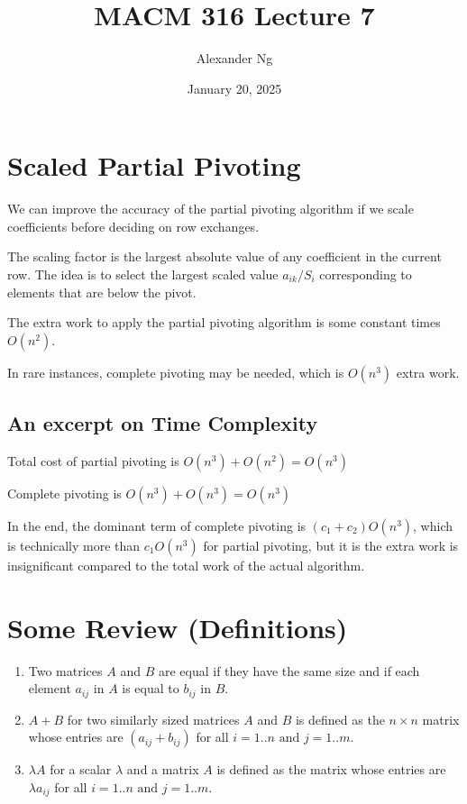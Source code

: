 \documentclass[12pt]{article}
\begin{document}
\renewcommand{\arraystretch}{1.25} %
\setlength{\arraycolsep}{12pt}

\title{MACM 316 Lecture 7}
\author{Alexander Ng}
\date{January 20, 2025}

\maketitle

\section{Scaled Partial Pivoting}

We can improve the accuracy of the partial pivoting algorithm if we scale 
coefficients before deciding on row exchanges.

The scaling factor is the largest absolute value of any coefficient in the 
current row. The idea is to select the largest scaled value $a_{ik}/S_i$
corresponding to elements that are below the pivot.

The extra work to apply the partial pivoting algorithm is some constant
times $O(n^2)$.

In rare instances, complete pivoting may be needed, which is $O(n^3)$ extra
work.

\subsection{An excerpt on Time Complexity}

Total cost of partial pivoting is $O(n^3) + O(n^2) = O(n^3)$

Complete pivoting is $O(n^3) + O(n^3) = O(n^3)$

In the end, the dominant term of complete pivoting is $(c_1 + c_2) O(n^3)$, 
which is technically more than $c_1 O(n^3)$ for partial pivoting, but it is
the extra work is insignificant compared to the total work of the actual 
algorithm.

\section{Some Review (Definitions)}

\begin{enumerate}
\item Two matrices $A$ and $B$ are equal if they have the same size and if each
  element $a_{ij}$ in $A$ is equal to $b_{ij}$ in $B$.
\item $A+B$ for two similarly sized matrices $A$ and $B$ is defined as
  the $n \times n$ matrix whose entries are $(a_{ij} + b_{ij})$ for all 
  $i = 1..n \text{ and } j = 1..m$.
\item $\lambda A$ for a scalar $\lambda$ and a matrix $A$ is defined as
  the matrix whose entries are $\lambda a_{ij}$ for all $i = 1..n \text{ and } 
  j = 1..m$.
\end{enumerate}
\end{document}
